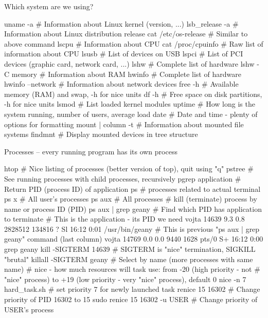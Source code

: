\documentclass[compress, ucs, xelatex, 11pt, xcolor=svgnames,
  hyperref={
    bookmarks=true,
    unicode=true,
    colorlinks=true,
    pdftitle={Linux, command line and MetaCentrum},
    plainpages=false,
    pdfauthor={Vojtech Zeisek},
    pdfsubject={Course about use of Linux command line, writing shell scripts and using MetaCentrum of CESNET},
    pdfcreator={XeLaTeX},
    pdfkeywords={Linux, GNU, BASH, shell, command line, MetaCentrum},
    linkcolor=DarkRed,
    anchorcolor=DarkBlue,
    citecolor=Indigo,
    filecolor=NavyBlue,
    menucolor=DarkMagenta,
    urlcolor=DarkBlue,
    pdftex},
  url={hyphens, lowtilde} %
  ]{beamer}
\begin{document}
\begin{frame}[fragile]{Which system are we using?}
  \begin{bashcode}
    uname -a # Information about Linux kernel (version, ...)
    lsb_release -a # Information about Linux distribution release
    cat /etc/os-release # Similar to above command
    lscpu # Information about CPU
    cat /proc/cpuinfo # Raw list of information about CPU
    lsusb # List of devices on USB
    lspci # List of PCI devices (graphic card, network card, ...)
    lshw # Complete list of hardware
    lshw -C memory # Information about RAM
    hwinfo # Complete list of hardware
    hwinfo --network # Information about network devices
    free -h # Available memory (RAM) and swap, -h for nice units
    df -h # Free space on disk partitions, -h for nice units
    lsmod # List loaded kernel modules
    uptime # How long is the system running, number of users, average load
    date # Date and time - plenty of options for formatting
    mount | column -t # Information about mounted file systems
    findmnt # Display mounted devices in tree structure
  \end{bashcode}
\end{frame}

\begin{frame}[fragile]{Processes -- every running program has its own process}
  \begin{bashcode}
    htop # Nice listing of processes (better version of top), quit using "q"
    pstree # See running processes with child processes, recursively
    pgrep application # Return PID (process ID) of application
    ps # processes related to actual terminal
    ps x # All user's processes
    ps aux # All processes
    # kill (terminate) process by name or process ID (PID)
    ps aux | grep geany # Find which PID has application to terminate
    # This is the application - its PID we need
    vojta 14639 9.3 0.8 2828512 134816 ?   Sl 16:12 0:01 /usr/bin/geany
    # This is previous "ps aux | grep geany" command (last column)
    vojta 14769 0.0 0.0   9440  1628 pts/0 S+ 16:12 0:00 grep geany
    kill -SIGTERM 14639 # SIGTERM is "nice" termination, SIGKILL "brutal"
    killall -SIGTERM geany # Select by name (more processes with same name)
    # nice - how much resources will task use: from -20 (high priority - not
    # "nice" process) to +19 (low priority - very "nice" process), default 0
    nice -n 7 hard_task.sh # set priority 7 for newly launched task
    renice 15 16302 # Change priority of PID 16302 to 15
    sudo renice 15 16302 -u USER # Change priority of USER's process
  \end{bashcode}
\end{frame}
\end{document}
